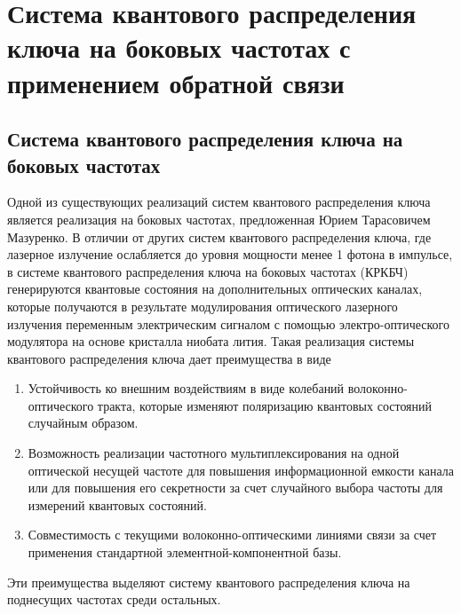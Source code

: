 \chapter{Система квантового распределения ключа на боковых частотах с применением обратной связи}\label{ch:ch2}
\section*{Система квантового распределения ключа на боковых частотах}
Одной из существующих реализаций систем квантового распределения ключа является реализация на боковых частотах, предложенная Юрием Тарасовичем Мазуренко. 
В отличии от других систем квантового распределения ключа, где лазерное излучение ослабляется до уровня мощности менее 1 фотона в импульсе, в системе квантового распределения ключа на боковых частотах (КРКБЧ) генерируются квантовые состояния на дополнительных оптических каналах, которые получаются в результате модулирования 
оптического лазерного излучения переменным электрическим сигналом с помощью электро-оптического модулятора на основе кристалла ниобата лития.
Такая реализация системы квантового распределения ключа дает преимущества в виде
\begin{enumerate}
    \item Устойчивость ко внешним воздействиям в виде колебаний волоконно-оптического тракта, которые изменяют поляризацию квантовых состояний случайным образом.
    \item Возможность реализации частотного мультиплексирования на одной оптической несущей частоте для повышения информационной емкости канала или для повышения его секретности за счет случайного выбора частоты для измерений квантовых состояний.
    \item Совместимость с текущими волоконно-оптическими линиями связи за счет применения стандартной элементной-компонентной базы. 
\end{enumerate}
Эти преимущества выделяют систему квантового распределения ключа на поднесущих частотах среди остальных.
